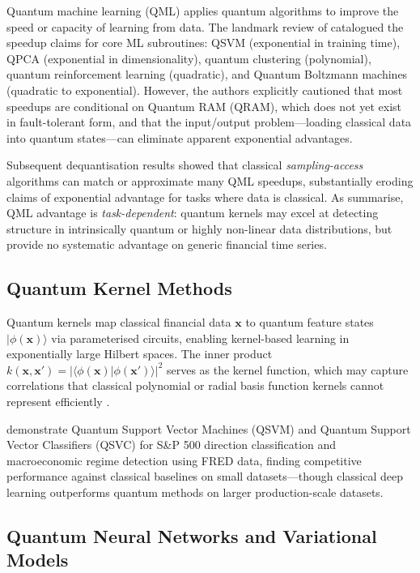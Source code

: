 \documentclass[12pt,a4paper]{article}
\begin{document}
Quantum machine learning (QML) applies quantum algorithms to improve the speed or capacity of learning from data. The landmark review of \citet{biamonte_quantum_2017} catalogued the speedup claims for core ML subroutines: QSVM (exponential in training time), QPCA (exponential in dimensionality), quantum clustering (polynomial), quantum reinforcement learning (quadratic), and Quantum Boltzmann machines (quadratic to exponential). However, the authors explicitly cautioned that most speedups are conditional on Quantum RAM (QRAM), which does not yet exist in fault-tolerant form, and that the input/output problem---loading classical data into quantum states---can eliminate apparent exponential advantages.

Subsequent dequantisation results \citep{herman_quantum_2023} showed that classical \emph{sampling-access} algorithms can match or approximate many QML speedups, substantially eroding claims of exponential advantage for tasks where data is classical. As \citet{gong_quantum_2026-1} summarise, QML advantage is \emph{task-dependent}: quantum kernels may excel at detecting structure in intrinsically quantum or highly non-linear data distributions, but provide no systematic advantage on generic financial time series.

\subsection{Quantum Kernel Methods}

Quantum kernels map classical financial data $\mathbf{x}$ to quantum feature states $|\phi(\mathbf{x})\rangle$ via parameterised circuits, enabling kernel-based learning in exponentially large Hilbert spaces. The inner product $k(\mathbf{x}, \mathbf{x}') = |\langle\phi(\mathbf{x})|\phi(\mathbf{x}')\rangle|^2$ serves as the kernel function, which may capture correlations that classical polynomial or radial basis function kernels cannot represent efficiently \citep{gong_quantum_2026-1}.

\citet{gong_quantum_2026-1} demonstrate Quantum Support Vector Machines (QSVM) and Quantum Support Vector Classifiers (QSVC) for S\&P 500 direction classification and macroeconomic regime detection using FRED data, finding competitive performance against classical baselines on small datasets---though classical deep learning outperforms quantum methods on larger production-scale datasets.

\subsection{Quantum Neural Networks and Variational Models}
\end{document}
